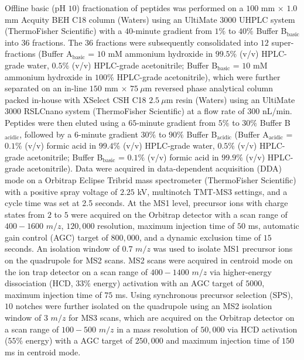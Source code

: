 \documentclass[journal=jprobs,manuscript=article]{achemso}
\begin{document}
Offline basic (pH $10$) fractionation of peptides was performed on a $100$ mm $\times$ $1.0$ mm Acquity BEH C18 column (Waters) using an UltiMate $3000$ UHPLC system (ThermoFisher Scientific) with a $40$-minute gradient from $1\%$ to $40\%$ Buffer B$_{\text{basic}}$ into $36$ fractions. The $36$ fractions were subsequently consolidated into $12$ super-fractions (Buffer A$_{\text{basic}}$ = $10$ mM ammonium hydroxide in $99.5\%$ (v/v) HPLC-grade water, $0.5\%$ (v/v) HPLC-grade acetonitrile; Buffer B$_{\text{basic}}$ = $10$ mM ammonium hydroxide in $100\%$ HPLC-grade acetonitrile), which were further separated on an in-line $150$ mm $\times$ $75 \ \mu$m reversed phase analytical column packed in-house with XSelect CSH C18 $2.5\ \mu$m resin (Waters) using an UltiMate $3000$ RSLCnano system (ThermoFisher Scientific) at a flow rate of $300$ nL/min. Peptides were then eluted using a $65$-minute gradient from $5\%$ to $30\%$ Buffer B$_{\text{acidic}}$, followed by a $6$-minute gradient $30\%$ to $90\%$ Buffer B$_{\text{acidic}}$ (Buffer A$_{\text{acidic}}$ = $0.1\%$ (v/v) formic acid in $99.4\%$ (v/v) HPLC-grade water, $0.5\%$ (v/v) HPLC-grade acetonitrile; Buffer B$_{\text{basic}}$ = $0.1\%$ (v/v) formic acid in $99.9\%$ (v/v) HPLC-grade acetonitrile). Data were acquired in data-dependent acquisition (DDA) mode on a Orbitrap Eclipse Tribrid mass spectrometer (ThermoFisher Scientific) with a positive spray voltage of $2.25$ kV, multinotch TMT-MS3 settings,\cite{mcalister2014multinotch} and a cycle time was set at 2.5 seconds. At the MS1 level, precursor ions with charge states from $2$ to $5$ were acquired on the Orbitrap detector with a scan range of $400-1600$ $m/z$, $120{,}000$ resolution, maximum injection time of $50$ ms, automatic gain control (AGC) target of $800{,}000$, and a dynamic exclusion time of $15$ seconds. An isolation window of $0.7$ $m/z$ was used to isolate MS1 precursor ions on the quadrupole for MS2 scans. MS2 scans were acquired in centroid mode on the ion trap detector on a scan range of $400-1400$ $m/z$ via higher-energy dissociation (HCD, $33\%$ energy) activation with an AGC target of $5000$, maximum injection time of $75$ ms. Using synchronous precursor selection (SPS)\cite{mcalister2014multinotch}, $10$ notches were further isolated on the quadrupole using an MS2 isolation window of $3$ $m/z$ for MS3 scans, which are acquired on the Orbitrap detector on a scan range of $100-500$ $m/z$ in a mass resolution of $50{,}000$ via HCD activation ($55\%$ energy) with a AGC target of $250{,}000$ and maximum injection time of $150$ ms in centroid mode.
\end{document}
